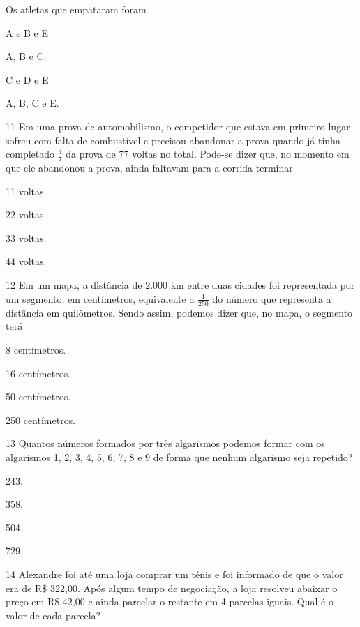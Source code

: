 Os atletas que empataram foram

\begin{escolha}
\item
  A e B e E
\item
  A, B e C.
\item
  C e D e E
\item
  A, B, C e E.
\end{escolha}


\num{11} Em uma prova de automobilismo, o competidor que estava em primeiro lugar
sofreu com falta de combustível e precisou abandonar a prova quando já
tinha completado $\frac{4}{7}$ da prova de 77 voltas no total. Pode-se dizer que,
no momento em que ele abandonou a prova, ainda faltavam para a corrida
terminar

\begin{escolha}
\item
  11 voltas.
\item
  22 voltas.
\item
  33 voltas.
\item
  44 voltas.
\end{escolha}


\num{12} Em um mapa, a distância de 2.000 km entre duas cidades foi representada
por um segmento, em centímetros, equivalente a $\frac{1}{250}$ do número que
representa a distância em quilômetros. Sendo assim, podemos dizer que, no
mapa, o segmento terá

\begin{escolha}
\item
  8 centímetros.
\item
  16 centímetros.
\item
  50 centímetros.
\item
  250 centímetros.
\end{escolha}


\num{13} Quantos números formados por três algarismos podemos formar com os
algarismos 1, 2, 3, 4, 5, 6, 7, 8 e 9 de forma que nenhum algarismo seja
repetido?

\begin{escolha}
\item
  243.
\item
  358.
\item
  504.
\item
  729.
\end{escolha}


\num{14} Alexandre foi até uma loja comprar um tênis e foi informado de que o valor
era de R\$ 322,00. Após algum tempo de negociação, a loja resolveu
abaixar o preço em R\$ 42,00 e ainda parcelar o restante em 4 parcelas iguais.
Qual é o valor de cada parcela?


